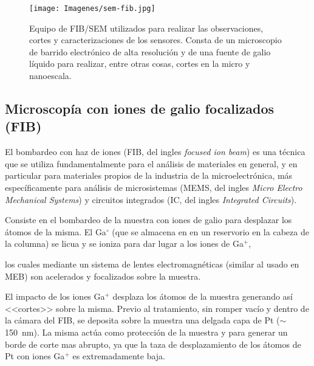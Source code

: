 					\begin{figure}[h!]
			 		  \begin{center}
			 		  \texttt{[image: Imagenes/sem-fib.jpg]}
			 		  \caption[Microscopio de doble haz FIB/SEM]{Equipo de FIB/SEM utilizados para realizar las observaciones, cortes y caracterizaciones de los sensores. Consta de un microscopio de barrido electrónico de alta resolución y de una fuente de galio líquido para realizar, entre otras cosas, cortes en la micro y nanoescala.}
			 		  \label{fig:sem-fib}
			 		  \end{center}
			 		  \end{figure}

	\subsection{Microscopía con iones de galio focalizados (FIB)}\label{sec:FIB}

		El bombardeo con haz de iones (FIB, del ingles \textit{focused ion beam}) es una técnica que se utiliza fundamentalmente para el análisis de materiales en general, y en particular para materiales propios de la industria de la microelectrónica, más específicamente para análisis de microsistemas (MEMS, del ingles \textit{Micro Electro Mechanical Systems}) y circuitos integrados (IC, del ingles \textit{Integrated Circuits}). 

		Consiste en el bombardeo de la muestra con iones de galio para desplazar los átomos de la misma. El Ga$^{\circ}$ (que se almacena en en un 
		reservorio en la cabeza de la columna) se licua y se ioniza para dar lugar a los iones de Ga${^+}$,
			
		 los cuales mediante un sistema de lentes electromagnéticas (similar al usado en MEB) son acelerados y focalizados sobre la muestra. 

		El impacto de los iones Ga${^+}$ desplaza los átomos de la muestra generando así <<cortes>> sobre la misma. Previo al tratamiento, sin romper vacío y dentro de la cámara del FIB, se deposita sobre la muestra una delgada capa de Pt ($\sim$\SI{150}{\nm}). La misma actúa como protección de la muestra y para generar un borde de corte mas abrupto, ya que la taza de desplazamiento de los átomos de Pt con iones Ga${^+}$ es extremadamente baja.\cite{Giannuzzi2005,Orloff1996} 

